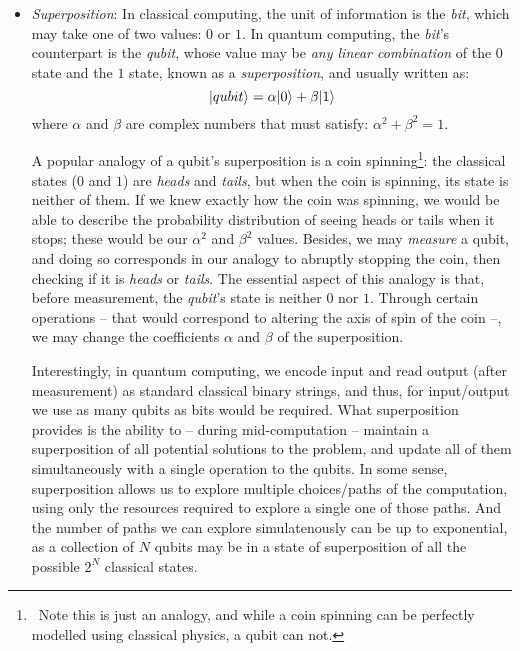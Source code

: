 \begin{itemize}

\item \textit{Superposition}: In classical computing, the unit of information is the \textit{bit}, which may take one of two values: \(0\) or \(1\). In quantum computing, the \textit{bit}'s counterpart is the \textit{qubit}, whose value may be \textit{any linear combination} of the \(0\) state and the \(1\) state, known as a \textit{superposition}, and usually written as: \[\vert qubit \rangle = \alpha\vert 0 \rangle + \beta\vert 1 \rangle\] where \(\alpha\) and \(\beta\) are complex numbers that must satisfy: \(\alpha^2 + \beta^2 = 1\).

A popular analogy of a qubit's superposition is a coin spinning\footnote{\, Note this is just an analogy, and while a coin spinning can be perfectly modelled using classical physics, a qubit can not.}: the classical states (\(0\) and \(1\)) are \textit{heads} and \textit{tails}, but when the coin is spinning, its state is neither of them. If we knew exactly how the coin was spinning, we would be able to describe the probability distribution of seeing heads or tails when it stops; these would be our \(\alpha^2\) and \(\beta^2\) values. Besides, we may \textit{measure} a qubit, and doing so corresponds in our analogy to abruptly stopping the coin, then checking if it is \textit{heads} or \textit{tails}. The essential aspect of this analogy is that, before measurement, the \textit{qubit}'s state is neither \(0\) nor \(1\). Through certain operations -- that would correspond to altering the axis of spin of the coin --, we may change the coefficients \(\alpha\) and \(\beta\) of the superposition. 

Interestingly, in quantum computing, we encode input and read output (after measurement) as standard classical binary strings, and thus, for input/output we use as many qubits as bits would be required. What superposition provides is the ability to -- during mid-computation -- maintain a superposition of all potential solutions to the problem, and update all of them simultaneously with a single operation to the qubits. In some sense, superposition allows us to explore multiple choices/paths of the computation, using only the resources required to explore a single one of those paths. And the number of paths we can explore simulatenously can be up to exponential, as a collection of \(N\) qubits may be in a state of superposition of all the possible \(2^N\) classical states.


\end{itemize}
